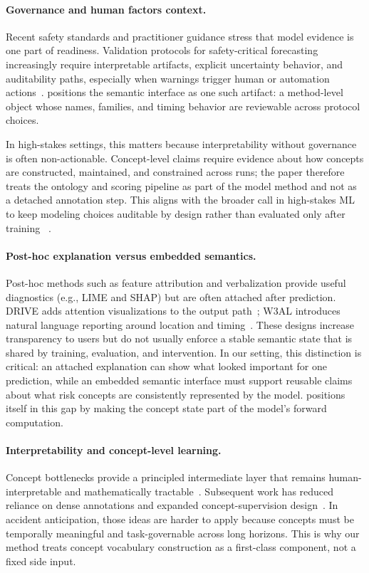 \paragraph{Governance and human factors context.}
Recent safety standards and practitioner guidance stress that model evidence is one part of readiness.
Validation protocols for safety-critical forecasting increasingly require interpretable
artifacts, explicit uncertainty behavior, and auditability paths, especially when
warnings trigger human or automation actions~\citep{who2023global,NHTSA2023}.
\method{} positions the semantic interface as one such artifact: a method-level
object whose names, families, and timing behavior are reviewable across protocol
choices.

In high-stakes settings, this matters because interpretability without governance
is often non-actionable. Concept-level claims require evidence about how concepts are
constructed, maintained, and constrained across runs; the paper therefore treats the
ontology and scoring pipeline as part of the model method and not as a detached
annotation step. This aligns with the broader call in high-stakes ML to keep
modeling choices auditable by design rather than evaluated only after training
~\citep{doshi2017towards,rudin2019stop}.

\paragraph{Post-hoc explanation versus embedded semantics.}
Post-hoc methods such as feature attribution and verbalization provide useful
diagnostics (e.g., LIME and SHAP) but are often attached after prediction.
DRIVE adds attention
visualizations to the output path~\citep{ref2}; W3AL introduces natural language
reporting around location and timing~\citep{liao2024and}. These designs increase
transparency to users but do not usually enforce a stable semantic state that is
shared by training, evaluation, and intervention. In our setting, this distinction is
critical: an attached explanation can show what looked important for one
prediction, while an embedded semantic interface must support reusable claims
about what risk concepts are consistently represented by the model.
\method{} positions itself in this gap by making the concept state part of the
model's forward computation.

\paragraph{Interpretability and concept-level learning.}
Concept bottlenecks provide a principled intermediate layer that remains
human-interpretable and mathematically tractable~\citep{tishby2000information,koh2020concept}.  
Subsequent work has reduced reliance on dense annotations and expanded
concept-supervision design~\citep{zarlenga2022concept,yuksekgonul2023posthoc,oikarinen2023label}.  
In accident anticipation, those ideas are harder to apply because concepts must
be temporally meaningful and task-governable across long horizons. This is why
our method treats concept vocabulary construction as a first-class component,
not a fixed side input.

